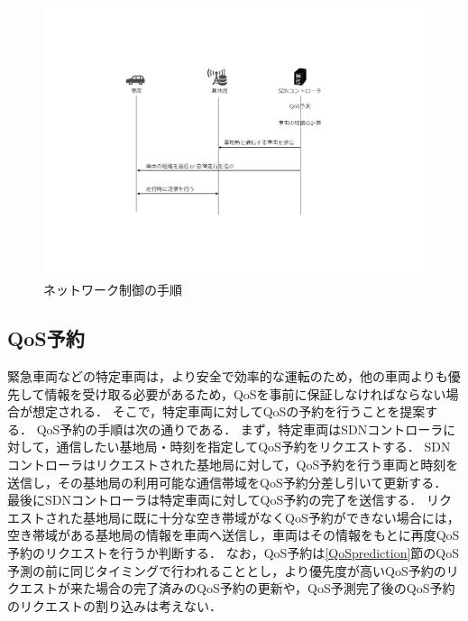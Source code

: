 \documentclass[a4paper,10pt,twocolumn,uplatex]{jsarticle}
\begin{document}
\begin{figure}[t]
	\begin{centering}
    \includegraphics[width=0.96\linewidth]{img/202210_ネットワーク制御.pdf}
    \caption{ネットワーク制御の手順}
    \label{fig:control}
    \end{centering}
\end{figure}

\subsection{QoS予約}
緊急車両などの特定車両は，より安全で効率的な運転のため，他の車両よりも優先して情報を受け取る必要があるため，QoSを事前に保証しなければならない場合が想定される．
そこで，特定車両に対してQoSの予約を行うことを提案する．
QoS予約の手順は次の通りである．
まず，特定車両はSDNコントローラに対して，通信したい基地局・時刻を指定してQoS予約をリクエストする．
SDNコントローラはリクエストされた基地局に対して，QoS予約を行う車両と時刻を送信し，その基地局の利用可能な通信帯域をQoS予約分差し引いて更新する．
最後にSDNコントローラは特定車両に対してQoS予約の完了を送信する．
リクエストされた基地局に既に十分な空き帯域がなくQoS予約ができない場合には，空き帯域がある基地局の情報を車両へ送信し，車両はその情報をもとに再度QoS予約のリクエストを行うか判断する．
なお，QoS予約は\ref{QoSprediction}節のQoS予測の前に同じタイミングで行われることとし，より優先度が高いQoS予約のリクエストが来た場合の完了済みのQoS予約の更新や，QoS予測完了後のQoS予約のリクエストの割り込みは考えない．

\end{document}
